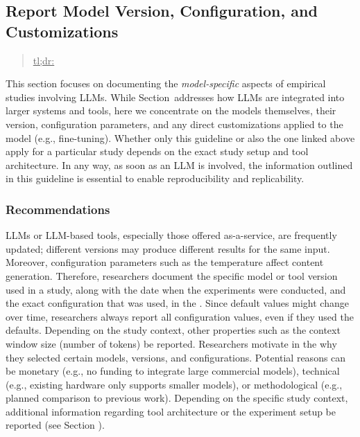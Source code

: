 



\subsection{Report Model Version, Configuration, and Customizations}
\label{sec:report-model-version-configuration-and-customizations}

\begin{quote}
\underline{tl;dr:} 
\end{quote}

This section focuses on documenting the \emph{model-specific} aspects of empirical studies involving LLMs.
While Section~\toolarchitecture addresses how LLMs are integrated into larger systems and tools, here we concentrate on the models themselves, their version, configuration parameters, and any direct customizations applied to the model (e.g., fine-tuning).
Whether only this guideline or also the one linked above apply for a particular study depends on the exact study setup and tool architecture.
In any way, as soon as an LLM is involved, the information outlined in this guideline is essential to enable reproducibility and replicability.

\subsubsection{Recommendations}

LLMs or LLM-based tools, especially those offered as-a-service, are frequently updated; different versions may produce different results for the same input.
Moreover, configuration parameters such as the temperature affect content generation.
Therefore, researchers \must document the specific model or tool version used in a study, along with the date when the experiments were conducted, and the exact configuration that was used, in the \paper.
Since default values might change over time, researchers \should always report all configuration values, even if they used the defaults.
Depending on the study context, other properties such as the context window size (number of tokens) \may be reported.
Researchers \should motivate in the \paper why they selected certain models, versions, and configurations.
Potential reasons can be monetary (e.g., no funding to integrate large commercial models), technical (e.g., existing hardware only supports smaller models), or methodological (e.g., planned comparison to previous work).
Depending on the specific study context, additional information regarding tool architecture or the experiment setup \should be reported (see Section \toolarchitecture).

